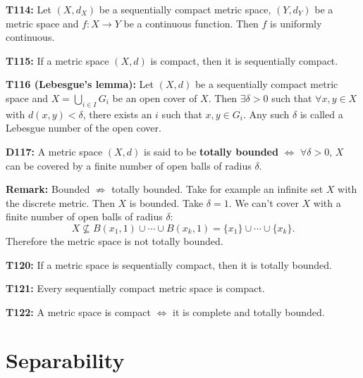 \documentclass[twocolumn,10pt]{article}
\begin{document}
\textbf{T114:} Let $(X,d_X)$ be a sequentially compact metric space, $(Y,d_Y)$ be a metric space and $f:X\to Y$ be a continuous function. Then $f$ is uniformly continuous.

\textbf{T115:} If a metric space $(X,d)$ is compact, then it is sequentially compact.

\textbf{T116 (Lebesgue's lemma):} Let $(X,d)$ be a sequentially compact metric space and $X=\bigcup_{i\in I}G_i$ be an open cover of $X$. Then $\exists\delta>0$ such that $\forall x,y\in X$ with $d(x,y)<\delta$, there exists an $i$ such that $x,y\in G_i$. Any such $\delta$ is called a Lebesgue number of the open cover.

\textbf{D117:} A metric space $(X,d)$ is said to be \textbf{totally bounded} $\Leftrightarrow$ $\forall\delta>0$, $X$ can be covered by a finite number of open balls of radius $\delta$.

\textbf{Remark:} Bounded $\not\Rightarrow$ totally bounded. Take for example an infinite set $X$ with the discrete metric. Then $X$ is bounded. Take $\delta=1$. We can't cover $X$ with a finite number of open balls of radius $\delta$:
\begin{equation*}
    X \not\subseteq B(x_1,1) \cup \cdots \cup B(x_k,1) = \{x_1\} \cup \cdots \cup \{x_k\}.
\end{equation*}
Therefore the metric space is not totally bounded.

\textbf{T120:} If a metric space is sequentially compact, then it is totally bounded.

\textbf{T121:} Every sequentially compact metric space is compact.

\textbf{T122:} A metric space is compact $\Leftrightarrow$ it is complete and totally bounded.


\section{Separability}
\end{document}
